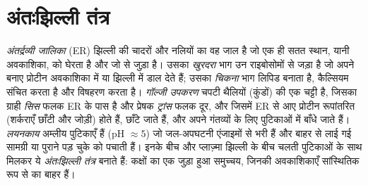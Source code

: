 \section{अंतःझिल्ली तंत्र}

\begin{definition}\label{def:b1:eukaryotic-cell:endomembrane}
\emph{अंतर्द्रव्यी जालिका} (ER) झिल्ली की
चादरों और नलियों का वह जाल है जो एक ही सतत स्थान, यानी अवकाशिका, को
घेरता है और जो  से जुड़ा है। उसका
\emph{खुरदरा} भाग उन राइबोसोमों से
जड़ा है जो अपने बनाए प्रोटीन अवकाशिका में या झिल्ली में डाल देते हैं;
उसका \emph{चिकना} भाग लिपिड बनाता है,
कैल्सियम संचित करता है और विषहरण करता है। \emph{गॉल्जी
उपकरण} चपटी थैलियों (कुंडों) की एक चट्टी है, जिसका
ग्राही \emph{सिस} फलक ER के पास है और प्रेषक \emph{ट्रांस} फलक दूर, और
जिसमें ER से आए प्रोटीन रूपांतरित (शर्कराएँ छाँटी और जोड़ी) होते हैं,
छाँटे जाते हैं, और अपने गंतव्यों के लिए पुटिकाओं में बाँधे जाते हैं।
\emph{लयनकाय} अम्लीय पुटिकाएँ हैं (pH $\approx 5$) जो
जल-अपघटनी एंजाइमों से भरी हैं और बाहर से लाई गई सामग्री या पुराने पड़
चुके  को पचाती हैं। इनके बीच और प्लाज़्मा झिल्ली के बीच चलती
पुटिकाओं के साथ मिलकर ये \emph{अंतःझिल्ली तंत्र}
बनाते हैं: कक्षों का एक जुड़ा हुआ समुच्चय, जिनकी अवकाशिकाएँ सांस्थितिक
रूप से  का बाहर हैं।
\end{definition}

